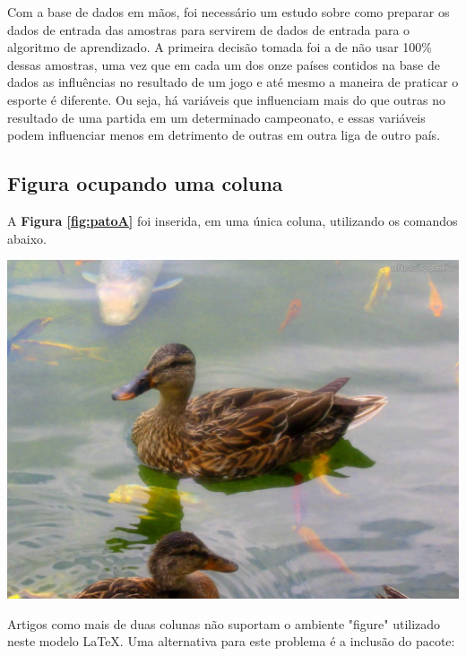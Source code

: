 Com a base de dados em mãos, foi necessário um estudo sobre como preparar os dados de entrada das amostras para servirem de dados de entrada para o algoritmo de aprendizado. A primeira decisão tomada foi a de não usar 100\% dessas amostras, uma vez que em cada um dos onze países contidos na base de dados as influências no resultado de um jogo e até mesmo a maneira de praticar o esporte é diferente. Ou seja, há variáveis que influenciam mais do que outras no resultado de uma partida em um determinado campeonato, e essas variáveis podem influenciar menos em detrimento de outras em outra liga de outro país.



\subsection{Figura ocupando uma coluna}		%

A \textbf{Figura \ref{fig:patoA}} foi inserida, em uma única coluna, utilizando os comandos abaixo.

\begin{center}
  \includegraphics[scale=0.08]{./02-figuras/pato}
  \label{fig:patoA}
\end{center}

Artigos como mais de duas colunas não suportam o ambiente "figure" utilizado neste modelo \LaTeX. Uma alternativa para este problema é a inclusão do pacote:

